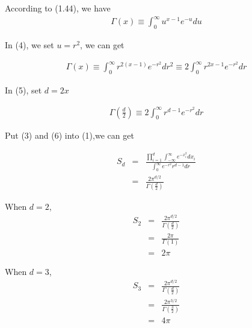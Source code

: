\documentclass{article} %
\begin{document}
According to (1.44),  we have
\begin{equation}
    \begin{array}{rcl}
      	\Gamma(x) \equiv \int_{0}^{\infty}u^{x-1}e^{-u} du
    \end{array}
\end{equation}

In (4), we set $u = r^2$, we can get

\begin{equation}
    \begin{array}{rcl}
      	\Gamma(x) \equiv \int_{0}^{\infty}r^{2(x-1)}e^{-r^2} dr^2 \equiv 2\int_{0}^{\infty}r^{2x-1}e^{-r^2} dr
    \end{array}
\end{equation}

In (5), set $d= 2x$

\begin{equation}
    \begin{array}{rcl}
      	\Gamma(\frac{d}{2})  \equiv 2\int_{0}^{\infty}r^{d-1}e^{-r^2} dr
    \end{array}
\end{equation}

Put (3) and (6) into (1),we can get

\begin{equation}
    \begin{array}{rcl}
     	S_d  & = & \frac{\prod\limits_{i = 1}^{d}\int_{-\infty}^{\infty}e^{-x_i^2} d x_i}{\int_{0}^{\infty}e^{-r^2}r^{d-1}dr} \\
	& = & \frac{2\pi^{d/2}}{\Gamma(\frac{d}{2})}
    \end{array}
\end{equation}

When $d = 2$,
\begin{equation}
    \begin{array}{rcl}
     	S_2  & = & \frac{2\pi^{d/2}}{\Gamma(\frac{d}{2})} \\
	& = & \frac{2\pi}{\Gamma(1)} \\
	& = & 2\pi
    \end{array}
\end{equation}

When $d = 3$,
\begin{equation}
    \begin{array}{rcl}
     	S_3  & = & \frac{2\pi^{d/2}}{\Gamma(\frac{d}{2})} \\
	& = & \frac{2\pi^{3/2}}{\Gamma(\frac{3}{2})} \\
	& = & 4\pi
    \end{array}
\end{equation}
\end{document}
